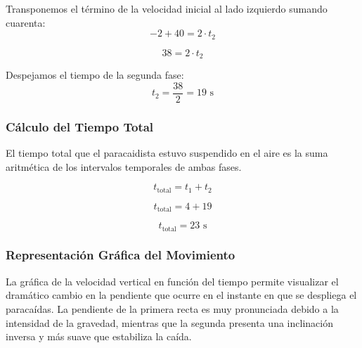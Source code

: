 \documentclass[12pt, a4paper]{article}
\begin{document}
Transponemos el término de la velocidad inicial al lado izquierdo sumando cuarenta:
\begin{equation}
-2 + 40 = 2 \cdot t_2
\end{equation}

\begin{equation}
38 = 2 \cdot t_2
\end{equation}

Despejamos el tiempo de la segunda fase:
\begin{equation}
t_2 = \frac{38}{2} = 19 \text{ s}
\end{equation}

\subsubsection*{Cálculo del Tiempo Total}

El tiempo total que el paracaidista estuvo suspendido en el aire es la suma aritmética de los intervalos temporales de ambas fases.

\begin{equation}
t_{\text{total}} = t_1 + t_2
\end{equation}

\begin{equation}
t_{\text{total}} = 4 + 19
\end{equation}

\begin{equation}
t_{\text{total}} = 23 \text{ s}
\end{equation}

\subsubsection*{Representación Gráfica del Movimiento}

La gráfica de la velocidad vertical en función del tiempo permite visualizar el dramático cambio en la pendiente que ocurre en el instante en que se despliega el paracaídas. La pendiente de la primera recta es muy pronunciada debido a la intensidad de la gravedad, mientras que la segunda presenta una inclinación inversa y más suave que estabiliza la caída.
\end{document}
